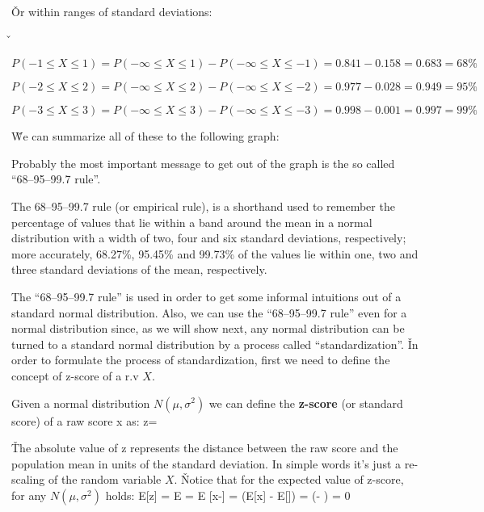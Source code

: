 \v

Or within ranges of standard deviations:

\v

\bit
\item $P(-1 \leq X \leq 1) = P(-\infty \leq X \leq 1) - P(-\infty \leq X \leq -1) = 0.841 - 0.158 = 0.683 = 68\%$
\item $P(-2 \leq X \leq 2) = P(-\infty \leq X \leq 2) - P(-\infty \leq X \leq -2) = 0.977 - 0.028 = 0.949 = 95\%$
\item $P(-3 \leq X \leq 3) = P(-\infty \leq X \leq 3) - P(-\infty \leq X \leq -3) = 0.998 - 0.001 = 0.997 = 99\%$
\eit

\v

We can summarize all of these to the following graph:


Probably the most important message to get out of the graph is the so called ``68–95–99.7 rule''.

\bt[68–95–99.7 Rule]
The 68–95–99.7 rule (or empirical rule), is a shorthand used to remember the percentage of values that lie within a
band around the mean in a normal distribution with a width of two, four and six standard deviations, respectively;
more accurately, 68.27\%, 95.45\% and 99.73\% of the values lie within one, two and three standard deviations of the
mean, respectively.
\et

The ``68–95–99.7 rule'' is used in order to get some informal intuitions out of a standard normal distribution.
Also, we can use the ``68–95–99.7 rule'' even for a normal distribution since, as we will show next, any normal
distribution can be turned to a standard normal distribution by a process called ``standardization''. \v

In order to formulate the process of standardization, first we need to define the concept of z-score of a r.v $X$.

\bd[Z-Score]
Given a normal distribution $N(\mu, \sigma^2)$ we can define the \textbf{z-score} (or standard score) of a raw score
x as:
\bse
z= 
\ese
\ed

\v

The absolute value of z represents the distance between the raw score and the population mean in units of the
standard deviation. In simple words it's just a re-scaling of the random variable $X$. \v

Notice that for the expected value of z-score, for any $N(\mu, \sigma^2)$ holds:
\bse
E[z] = E  =  E [x-\mu] =  (E[x] - E[\mu])
=  (\mu - \mu) = 0
\ese

